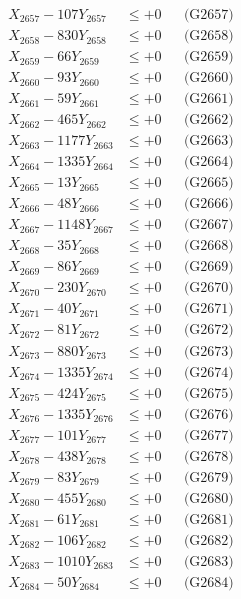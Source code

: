 \documentclass[a4paper,10pt]{article}
\begin{document}
{\begin{align}
X_{2657} - 107Y_{2657} &\leq +0 && \text{(G2657)} \\
X_{2658} - 830Y_{2658} &\leq +0 && \text{(G2658)} \\
X_{2659} - 66Y_{2659} &\leq +0 && \text{(G2659)} \\
X_{2660} - 93Y_{2660} &\leq +0 && \text{(G2660)} \\
\allowbreak
X_{2661} - 59Y_{2661} &\leq +0 && \text{(G2661)} \\
X_{2662} - 465Y_{2662} &\leq +0 && \text{(G2662)} \\
X_{2663} - 1177Y_{2663} &\leq +0 && \text{(G2663)} \\
X_{2664} - 1335Y_{2664} &\leq +0 && \text{(G2664)} \\
X_{2665} - 13Y_{2665} &\leq +0 && \text{(G2665)} \\
X_{2666} - 48Y_{2666} &\leq +0 && \text{(G2666)} \\
X_{2667} - 1148Y_{2667} &\leq +0 && \text{(G2667)} \\
X_{2668} - 35Y_{2668} &\leq +0 && \text{(G2668)} \\
X_{2669} - 86Y_{2669} &\leq +0 && \text{(G2669)} \\
X_{2670} - 230Y_{2670} &\leq +0 && \text{(G2670)} \\
\allowbreak
X_{2671} - 40Y_{2671} &\leq +0 && \text{(G2671)} \\
X_{2672} - 81Y_{2672} &\leq +0 && \text{(G2672)} \\
X_{2673} - 880Y_{2673} &\leq +0 && \text{(G2673)} \\
X_{2674} - 1335Y_{2674} &\leq +0 && \text{(G2674)} \\
X_{2675} - 424Y_{2675} &\leq +0 && \text{(G2675)} \\
X_{2676} - 1335Y_{2676} &\leq +0 && \text{(G2676)} \\
X_{2677} - 101Y_{2677} &\leq +0 && \text{(G2677)} \\
X_{2678} - 438Y_{2678} &\leq +0 && \text{(G2678)} \\
X_{2679} - 83Y_{2679} &\leq +0 && \text{(G2679)} \\
X_{2680} - 455Y_{2680} &\leq +0 && \text{(G2680)} \\
\allowbreak
X_{2681} - 61Y_{2681} &\leq +0 && \text{(G2681)} \\
X_{2682} - 106Y_{2682} &\leq +0 && \text{(G2682)} \\
X_{2683} - 1010Y_{2683} &\leq +0 && \text{(G2683)} \\
X_{2684} - 50Y_{2684} &\leq +0 && \text{(G2684)} \\

\end{align}}
\end{document}
